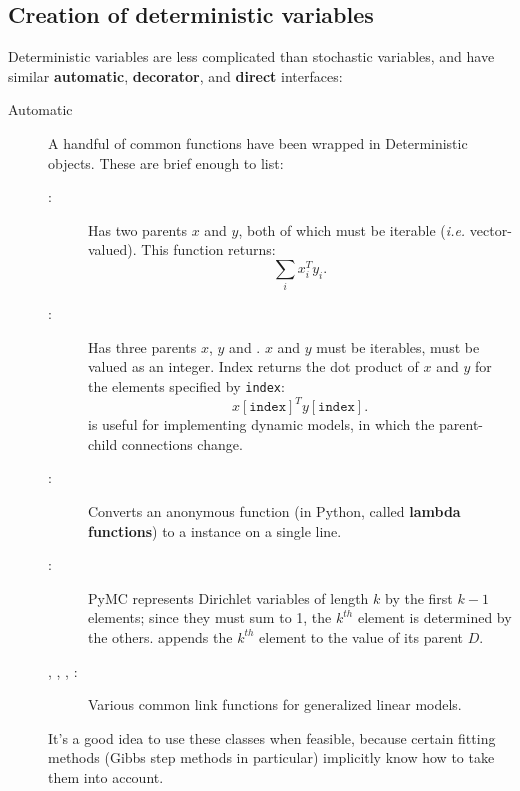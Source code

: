 \subsection{Creation of deterministic variables}
Deterministic variables are less complicated than stochastic variables, and have similar \textbf{automatic}, \textbf{decorator}, and \textbf{direct} interfaces:
\begin{description}
   \item[Automatic] A handful of common functions have been wrapped in Deterministic objects. These are brief enough to list:
   \begin{description}
      \item[:] Has two parents $x$ and $y$, both of which must be iterable (\emph{i.e.} vector-valued). This function returns:
      \[
      \sum_i x_i^T y_i.
      \]
      \item[:] Has three parents $x$, $y$ and . $x$ and $y$ must be iterables,  must be valued as an integer. Index returns the dot product of $x$ and $y$ for the elements specified by \texttt{index}:
      \[
      x[\mathtt{index}]^T y[\mathtt{index}].
      \]
       is useful for implementing dynamic models, in which the parent-child connections change.
      \item[:] Converts an anonymous function (in Python, called \textbf{lambda functions}) to a  instance on a single line.
      \item[:] PyMC represents Dirichlet variables of length $k$ by the first $k-1$ elements; since they must sum to 1, the $k^{th}$ element is determined by the others.  appends the $k^{th}$ element to the value of its parent $D$.      
      \item[, , , :] Various common link functions for generalized linear models.
   \end{description}
   It's a good idea to use these classes when feasible, because certain fitting methods (Gibbs step methods in particular) implicitly know how to take them into account.


\end{description}
